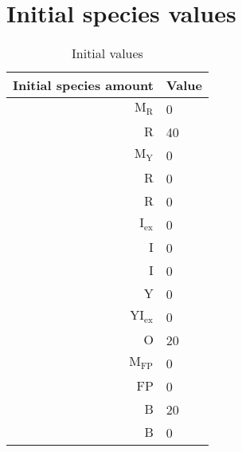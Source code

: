 \documentclass[11pt]{article}
\begin{document}
\section{Initial species values}
\begin{table}
    \centering
    \begin{tabular}{r|l}
    Initial species amount & Value \\
    \hline
            $ 
            \text{M}_{\text{R}} 
            $
               &
            $ 
            $0$ 
            $
        \\
            $ 
            \text{R} 
            $
               &
            $ 
            $40$ 
            $
        \\
            $ 
            \text{M}_{\text{Y}} 
            $
               &
            $ 
            $0$ 
            $
        \\
            $ 
            \text{R} 
            $
               &
            $ 
            $0$ 
            $
        \\
            $ 
            \text{R} 
            $
               &
            $ 
            $0$ 
            $
        \\
            $ 
            \text{I}_{\text{ex}} 
            $
               &
            $ 
            $0$ 
            $
        \\
            $ 
            \text{I} 
            $
               &
            $ 
            $0$ 
            $
        \\
            $ 
            \text{I} 
            $
               &
            $ 
            $0$ 
            $
        \\
            $ 
            \text{Y} 
            $
               &
            $ 
            $0$ 
            $
        \\
            $ 
            \text{YI}_{\text{ex}} 
            $
               &
            $ 
            $0$ 
            $
        \\
            $ 
            \text{O} 
            $
               &
            $ 
            $20$ 
            $
        \\
            $ 
            \text{M}_{\text{FP}} 
            $
               &
            $ 
            $0$ 
            $
        \\
            $ 
            \text{FP} 
            $
               &
            $ 
            $0$ 
            $
        \\
            $ 
            \text{B} 
            $
               &
            $ 
            $20$ 
            $
        \\
            $ 
            \text{B} 
            $
               &
            $ 
            $0$ 
            $
        \\
    \hline
    \end{tabular}
    \caption{Initial values}
    \label{tab:initialvalues}
\end{table}
\end{document}
